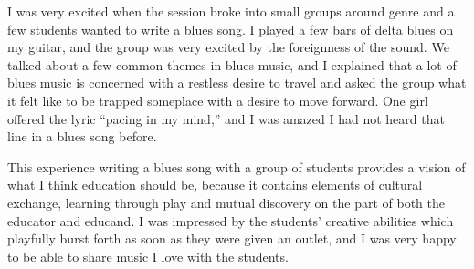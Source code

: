 \documentclass[oneside]{memoir}
\begin{document}
I was very excited when the session broke into small groups around
genre and a few students wanted to write a blues song.
I played a few bars of delta blues on my guitar, and the group was
very excited by the foreignness of the sound.
We talked about a few common themes in blues music, and I explained
that a lot of blues music is concerned with a restless desire to
travel and asked the group what it felt like to be trapped someplace
with a desire to move forward.
One girl offered the lyric ``pacing in my mind,'' and I was amazed I
had not heard that line in a blues song before.

This experience writing a blues song with a group of students provides
a vision of what I think education should be, because it contains
elements of cultural exchange, learning through play and mutual
discovery on the part of both the educator and educand.
I was impressed by the students' creative abilities which playfully
burst forth as soon as they were given an outlet, and I was very happy
to be able to share music I love with the students.
\end{document}
